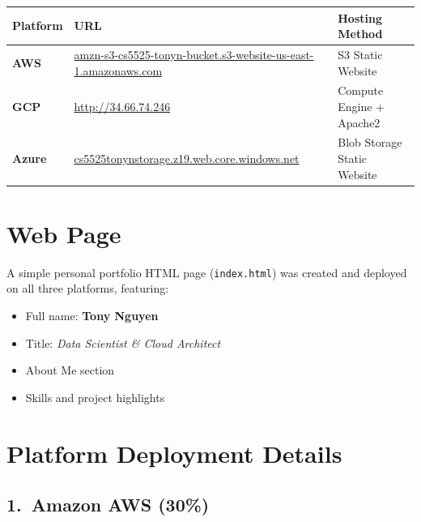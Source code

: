 \documentclass[12pt,letterpaper]{article}
\begin{document}
\begin{center}
\begin{tabularx}{\linewidth}{@{} l X l @{}}
\toprule
\textbf{Platform} & \textbf{URL} & \textbf{Hosting Method} \\
\midrule
\textbf{AWS} &
  \href{http://amzn-s3-cs5525-tonyn-bucket.s3-website-us-east-1.amazonaws.com}%
       {\small amzn-s3-cs5525-tonyn-bucket.s3-website-us-east-1.amazonaws.com} &
  S3 Static Website \\[4pt]
\textbf{GCP} &
  \href{http://34.66.74.246}{\small http://34.66.74.246} &
  Compute Engine + Apache2 \\[4pt]
\textbf{Azure} &
  \href{https://cs5525tonynstorage.z19.web.core.windows.net}%
       {\small cs5525tonynstorage.z19.web.core.windows.net} &
  Blob Storage Static Website \\
\bottomrule
\end{tabularx}
\end{center}

\section{Web Page}

A simple personal portfolio HTML page (\texttt{index.html}) was created and deployed
on all three platforms, featuring:

\begin{itemize}
  \item Full name: \textbf{Tony Nguyen}
  \item Title: \textit{Data Scientist \& Cloud Architect}
  \item About Me section
  \item Skills and project highlights
\end{itemize}

\section{Platform Deployment Details}

\subsection{1.\ Amazon AWS (30\%)}
\end{document}
